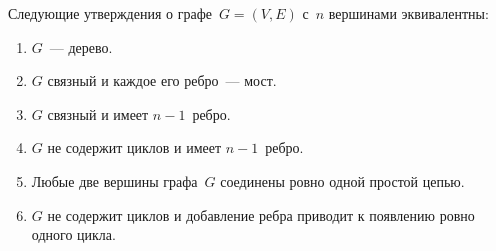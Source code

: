 \begin{theorem}
Следующие утверждения о графе~$G = (V, E)$ с~$n$ вершинами эквивалентны:
\begin{enumerate}[(1)]
	\item $G$~--- дерево.
	\item $G$ связный и каждое его ребро~--- мост.
	\item $G$ связный и имеет $n - 1$~ребро.
	\item $G$ не содержит циклов и имеет $n - 1$~ребро.
	\item Любые две вершины графа~$G$ соединены ровно одной простой цепью.
	\item $G$ не содержит циклов и добавление ребра приводит к появлению ровно одного цикла.
\end{enumerate}
\end{theorem}
